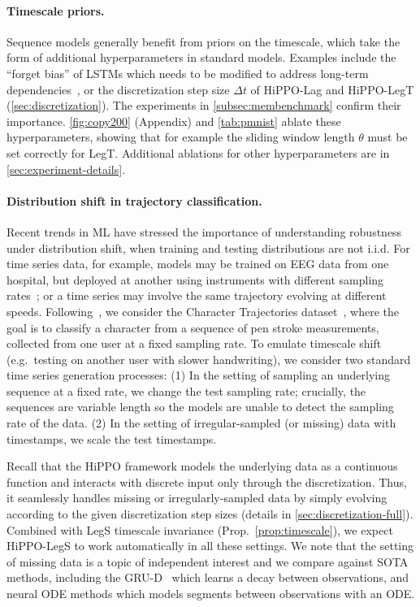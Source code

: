 \documentclass{article}
\begin{document}
\paragraph{Timescale priors.}
Sequence models generally benefit from priors on the timescale,
which take the form of additional hyperparameters in standard models.
Examples include the ``forget bias'' of LSTMs which needs to be modified to address long-term dependencies~\cite{jozefowicz2015empirical,tallec2018can},
or the discretization step size $\Delta t$ of HiPPO-Lag and HiPPO-LegT (\cref{sec:discretization}).
The experiments in \cref{subsec:membenchmark} confirm their importance.
\cref{fig:copy200} (Appendix) and \cref{tab:pmnist} ablate these hyperparameters,
showing that for example the sliding window length $\theta$ must be set correctly for LegT.
Additional ablations for other hyperparameters are in \cref{sec:experiment-details}.



\paragraph{Distribution shift in trajectory classification.}
Recent trends in ML have stressed the importance of understanding robustness under distribution shift, when training and testing distributions are not i.i.d.
For time series data, for example, models may be trained on EEG data from one hospital, but deployed at another using instruments with different sampling rates~\citep{shah2018temple, saab2020weak}; or a time series may involve the same trajectory evolving at different speeds.
Following~\citet{kidger2020neural}, we consider the Character Trajectories dataset~\citep{bagnall2018uea},
where the goal is to classify a character from a sequence of pen stroke measurements, collected from one user at a fixed sampling rate.
To emulate timescale shift (e.g.\ testing on another user with slower handwriting),
we consider two standard time series generation processes:
(1) In the setting of sampling an underlying sequence at a fixed rate, we change the test sampling rate; crucially, the sequences are variable length so the models are unable to detect the sampling rate of the data.
(2) In the setting of irregular-sampled (or missing) data with timestamps, we scale the test timestamps.





Recall that the HiPPO framework models the underlying data as a continuous function and interacts with discrete input only through the discretization.
Thus, it seamlessly handles missing or irregularly-sampled data by simply evolving according to the given discretization step sizes (details in \cref{sec:discretization-full}).
Combined with LegS timescale invariance (Prop.~\ref{prop:timescale}), we expect HiPPO-LegS to work automatically in all these settings.
We note that the setting of missing data is a topic of independent interest and we compare against SOTA methods, including the GRU-D~\cite{che2018recurrent} which learns a decay between observations,
and neural ODE methods which models segments between observations with an ODE.
\end{document}
